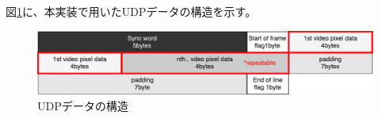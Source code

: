 %
%

図\ref{fig:fpga-video-packet}に、本実装で用いたUDPデータの構造を示す。

\begin{figure}[htbp]
  \begin{center}
    \includegraphics[bb=0 0 643 122,width=15.5cm]{img/fpga-video-packet.pdf}
  \end{center}
  \caption{UDPデータの構造}
  \label{fig:fpga-video-packet}
\end{figure}

